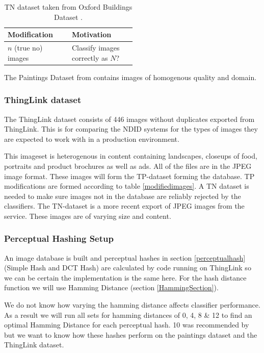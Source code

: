 \documentclass[english,12pt,a4paper,pdftex,elec,utf8]{aaltothesis}
\begin{document}
\def\arraystretch{1.5}
\begin{table}[htb]
\caption{TN dataset taken from Oxford Buildings Dataset \cite{PhilbinJamesArandjelovicReljaZisserman2012}.}
\label{truenegatives}
\begin{center}
\begin{tabular}{lp{0.5\linewidth}}
  Modification & Motivation \\
  \hline \hline
  $n$ (true no) images  & Classify images correctly as $N$?\\
\end{tabular}
\end{center}\end{table}

The Paintings Dataset from \cite{Vedaldi2012} contains images of homogenous quality and domain.

\subsubsection{ThingLink dataset}
The ThingLink dataset consists of 446 images without duplicates exported from ThingLink. This is for comparing the NDID systems for the types of images they are expected to work with in a production environment.

This imageset is heterogenous in content containing landscapes, closeups of food, portraits and product brochures as well as ads. All of the files are in the JPEG image format. These images will form the TP-dataset forming the database. TP modifications are formed according to table \ref{modifiedimages}. A TN dataset is needed to make sure images not in the database are reliably rejected by the classifiers. The TN-dataset is a more recent export of JPEG images from the service. These images are of varying size and content.

\subsubsection{Perceptual Hashing Setup}
An image database is built and perceptual hashes in section \ref{perceptualhash} (Simple Hash and DCT Hash) are calculated by code running on ThingLink so we can be certain the implementation is the same here. For the hash distance function we will use Hamming Distance (section \ref{HammingSection}).

We do not know how varying the hamming distance affects classifier performance. As a result we will run all sets for hamming distances of 0, 4, 8 \& 12 to find an optimal Hamming Distance for each perceptual hash. 10 was recommended by \cite{Zauner2010} but we want to know how these hashes perform on the paintings dataset and the ThingLink dataset.
\end{document}
